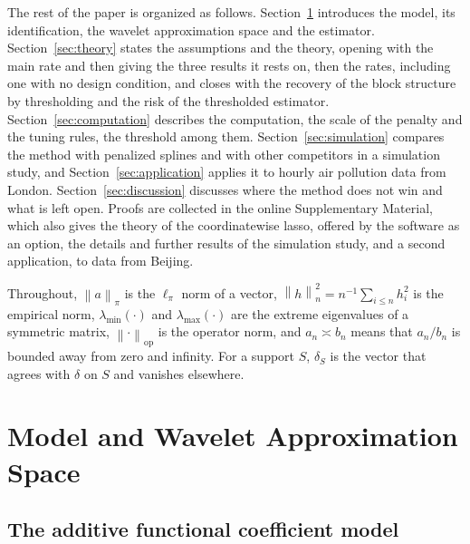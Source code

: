 \documentclass[12pt]{article} %
\theoremstyle{definition}
\theoremstyle{plain}
\newcommand{\norm}[1]{\left\lVert #1 \right\rVert}
\newcommand{\normn}[1]{\left\lVert #1 \right\rVert_{n}}
\newcommand{\lmin}{\lambda_{\min}}
\newcommand{\lmaxx}{\lambda_{\max}}
\newcommand{\opnorm}[1]{\left\lVert #1 \right\rVert_{\mathrm{op}}}
\begin{document}
The rest of the paper is organized as follows. Section~\ref{sec:model}
introduces the model, its identification, the wavelet \textcolor{colR1}{approximation space} and the estimator.
Section~\ref{sec:theory} states the assumptions and the theory, opening with
the main rate and then giving the three results it rests on\textcolor{colR1}{, then
the rates, including one with no design condition,} \textcolor{colR1}{and
closes with the recovery of the block structure by thresholding} \textcolor{colR1}{and
the risk of the thresholded estimator}.
Section~\ref{sec:computation} describes the computation, the scale of the
penalty and the tuning rules\textcolor{colR1}{, the threshold among them}.
\textcolor{colR1}{Section~\ref{sec:simulation} compares the method with penalized
splines and with other competitors in a simulation study, and
Section~\ref{sec:application} applies it to hourly air pollution data from
London.} \textcolor{colR1}{Section~\ref{sec:discussion} discusses where the method
does not win and what is left open.} Proofs are collected in the online Supplementary
Material\textcolor{colR1}{, which also gives the theory of the coordinatewise lasso,
offered by the software as an option}\textcolor{colR1}{, the details and further
results of the simulation study, and a second application, to data from
Beijing}.

Throughout, $\norm{a}_\pi$ is the $\ell_\pi$ norm of a vector,
$\normn{h}^2 = n^{-1}\sum_{i\le n} h_i^2$ is the empirical norm,
$\lmin(\cdot)$ and $\lmaxx(\cdot)$ are the extreme eigenvalues of a symmetric
matrix, $\opnorm{\cdot}$ is the operator norm, and $a_n \asymp b_n$ means that
$a_n/b_n$ is bounded away from zero and infinity. For a support
$S$, $\delta_S$ is the vector that agrees with $\delta$ on $S$ and vanishes
elsewhere.

\section{Model and Wavelet \texorpdfstring{\textcolor{colR1}{Approximation Space}}{Approximation Space}}
\label{sec:model}

\subsection{The additive functional coefficient model}
\label{sec:model-def}
\end{document}

